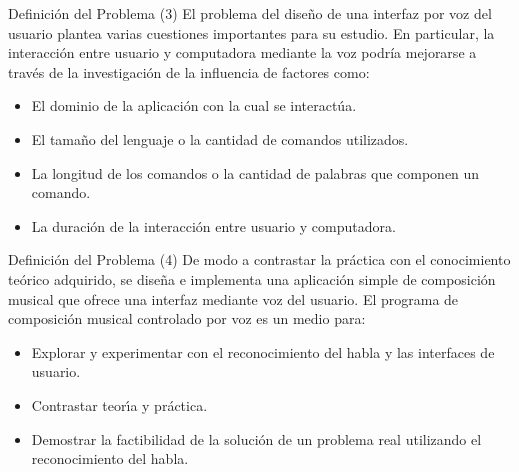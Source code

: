 \begin{frame}{Definici\'on del Problema (3)}
El problema del dise\~no de una interfaz por voz del usuario plantea varias cuestiones importantes para
su estudio. En particular, la interacción entre usuario y computadora mediante la voz podría mejorarse
a través de la investigación de la influencia de factores como:  


\begin{itemize}
    \item El dominio de la aplicaci\'on con la cual se interactúa.
    \item El tama\~no del lenguaje o la cantidad de comandos utilizados.
    \item La longitud de los comandos o la cantidad de palabras que componen un comando.
    \item La duraci\'on de la interacci\'on entre usuario y computadora.
\end{itemize}


\end{frame}

\begin{frame}{Definici\'on del Problema (4)}
De modo a contrastar la pr\'actica con el conocimiento te\'orico adquirido,
se diseña e implementa una aplicación simple de composición musical que ofrece una
interfaz mediante voz del usuario.
El programa de composici\'on musical controlado por voz es un medio para:

\begin{itemize}
    \item Explorar y experimentar con el reconocimiento del habla y las interfaces de usuario.
    \item Contrastar teor{\'\i}a y pr\'actica.
    \item Demostrar la factibilidad de la soluci\'on de un problema real utilizando el
    reconocimiento del habla.
\end{itemize}
\end{frame}
